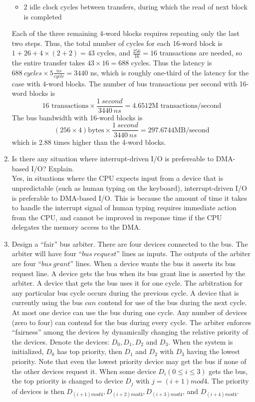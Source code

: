 \documentclass[10pt,letterpaper]{article}
\begin{document}
\begin{enumerate}[label=\textbf{Problem \arabic*.}]
\begin{itemize}
	\item 2 idle clock cycles between transfers, during which the read of next block is completed
	\end{itemize}
Each of the three remaining 4-word blocks requires repeating only the last two steps.
Thus, the total number of cycles for each 16-word block is $1+26+4\times(2+2)=43$ cycles, and $\frac{256}{16}=16$ transactions are needed, so the entire transfer takes $43\times16=688$ cycles. Thus the latency is $688 \ cycles \times 5 \frac{ns}{cycle} = 3440$ ns, which is roughly one-third of the latency for the case with 4-word blocks. The number of bus transactions per second with 16-word blocks is
\[\boxed{16 \text{ transactions} \times \frac{1 \ second}{3440 \ ns} = 4.6512 \text{M transactions/second}}\]
The bus bandwidth with 16-word blocks is
\[\boxed{(256\times4)\text{bytes}\times\frac{1 \ second}{3440 \ ns}=297.6744 \text{MB/second}}\] which is 2.88 times higher than the 4-word blocks.
\item Is there any situation where interrupt-driven I/O is prefereable to DMA-based I/O? Explain.\\
Yes, in situations where the CPU expects input from a device that is unpredictable (such as human typing on the keyboard), interrupt-driven I/O is preferable to DMA-based I/O. This is because the amount of time it takes to handle the interrupt signal of human typing requires immediate action from the CPU, and cannot be improved in response time if the CPU delegates the memory access to the DMA.
\item Design a ``fair'' bus arbiter. There are four devices connected to the bus. The arbiter will have four ``$bus \ request$'' lines as inputs. The outputs of the arbiter are four ``$bus \ grant$'' lines. When a device wants the bus it asserts its bus request line. A device gets the bus when its bus grant line is asserted by the arbiter. A device that gets the bus uses it for one cycle. The arbitration for any particular bus cycle occurs during the previous cycle. A device that is currently using the bus $can$ contend for use of the bus during the next cycle. At most one device can use the bus during one cycle. Any number of devices (zero to four) can contend for the bus during every cycle. The arbiter enforces ``fairness'' among the devices by dynamically changing the relative priority of the devices. Denote the devices: $D_0,D_1,D_2$ and $D_3$. When the system is initialized, $D_0$ has top priority, then $D_1$ and $D_2$ with $D_3$ having the lowest priority. Note that even the lowest priority device may get the bus if none of the other devices request it. When some device $D_i (0\leq i \leq 3)$ gets the bus, the top priority is changed to device $D_j$ with $j=(i+1)mod4$. The priority of devices is then $D_{(i+1)mod4},D_{(i+2)mod4},D_{(i+3)mod4}$, and $D_{(i+4)mod4}$.

\end{enumerate}
\end{document}
